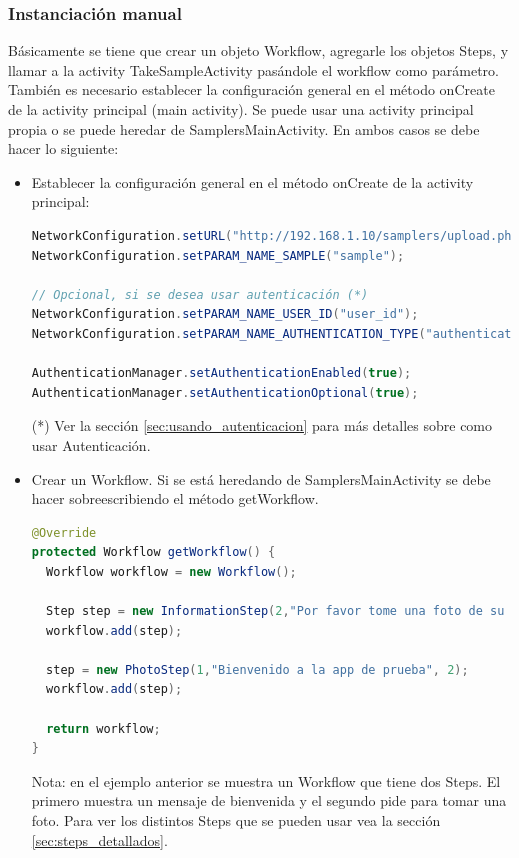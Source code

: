 \subsubsection{Instanciación manual}
Básicamente se tiene que crear un objeto Workflow, agregarle los objetos Steps, y llamar a la activity TakeSampleActivity pasándole el workflow como parámetro.
También es necesario establecer la configuración general en el método onCreate de la activity principal (main activity).
Se puede usar una activity principal propia o se puede heredar de SamplersMainActivity. En ambos casos se debe hacer lo siguiente:
\begin{itemize}
	\item Establecer la configuración general en el método onCreate de la activity principal:
		\begin{lstlisting}[language=Java, frame=tlb]
NetworkConfiguration.setURL("http://192.168.1.10/samplers/upload.php");
NetworkConfiguration.setPARAM_NAME_SAMPLE("sample");

// Opcional, si se desea usar autenticación (*)
NetworkConfiguration.setPARAM_NAME_USER_ID("user_id");
NetworkConfiguration.setPARAM_NAME_AUTHENTICATION_TYPE("authentication_type");

AuthenticationManager.setAuthenticationEnabled(true);
AuthenticationManager.setAuthenticationOptional(true);
		\end{lstlisting}
(*) Ver la sección \ref{sec:usando_autenticacion} para más detalles sobre como usar Autenticación.


	\item Crear un Workflow. Si se está heredando de SamplersMainActivity se debe hacer sobreescribiendo el método getWorkflow.
		\begin{lstlisting}[language=Java, frame=tlb]
@Override
protected Workflow getWorkflow() {
  Workflow workflow = new Workflow();
    	
  Step step = new InformationStep(2,"Por favor tome una foto de su gato", null);
  workflow.add(step);
    	
  step = new PhotoStep(1,"Bienvenido a la app de prueba", 2);
  workflow.add(step);
    	
  return workflow;
}		
		\end{lstlisting}
Nota: en el ejemplo anterior se muestra un Workflow que tiene dos Steps. El primero muestra un mensaje de bienvenida y el segundo pide para tomar una foto. Para ver los distintos Steps que se pueden usar vea la sección \ref{sec:steps_detallados}.


\end{itemize}

